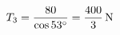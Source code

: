 \documentclass[preview]{standalone}
\begin{document}
\begin{align*}
\special{dvisvgm:raw <g id='unique000'>}T_3 = \frac{80}{\cos 53^{\circ}} = \frac{400}{3}\,\mathrm{N}\special{dvisvgm:raw </g>}
\end{align*}
\end{document}
